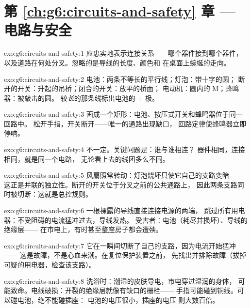 \section*{第 \ref{ch:g6:circuits-and-safety} 章 --- 电路与安全}

\begin{solution}{exo:g6:circuits-and-safety:1}
应忠实地表示连接关系——哪个器件接到哪个器件，
以及道路在何处分叉。忽略的是导线的长度、颜色和
在桌面上蜿蜒的走向。
\end{solution}

\begin{solution}{exo:g6:circuits-and-safety:2}
电池：两条不等长的平行线；灯泡：带十字的圆；
断开的开关：升起的吊桥；闭合的开关：放平的桥面；
电动机：圆内的 M；蜂鸣器：被敲击的圆。
较\emph{长}的那条线标出电池的 $+$ 极。
\end{solution}

\begin{solution}{exo:g6:circuits-and-safety:3}
画成一个矩形：电池、按压式开关和蜂鸣器位于同一回路中。
松开手指，开关断开——唯一的通路出现缺口，
回路定律使蜂鸣器立即停响。
\end{solution}

\begin{solution}{exo:g6:circuits-and-safety:4}
不一定。关键问题是：谁与谁相连？
器件相同，连接相同，就是同一个电路，
无论看上去的线团多么不同。
\end{solution}

\begin{solution}{exo:g6:circuits-and-safety:5}
风扇照常转动：灯泡烧坏只使它自己的支路变暗——
这正是并联的独立性。断开的开关位于分叉之前的公共通路上，
因此两条支路同时被切断：这就是总控规则。
\end{solution}

\begin{solution}{exo:g6:circuits-and-safety:6}
一根裸露的导线直接连接电源的两端，
跳过所有用电器：不受阻碍的电流猛冲过去，导线发热。
受害者：电池（耗尽并损坏）、导线的绝缘层——
在市电上，有时甚至整座房子都会遭殃。
\end{solution}

\begin{solution}{exo:g6:circuits-and-safety:7}
它在一瞬间切断了自己的支路，因为电流开始猛冲——
这是故障，不是心血来潮。在复位保护装置之前，
先找出并排除故障（拔掉可疑的用电器，检查该支路）。
\end{solution}

\begin{solution}{exo:g6:circuits-and-safety:8}
洗浴时：潮湿的皮肤导电，市电穿过湿润的身体，
可能致命。电线破损：开裂的绝缘层就像有缺口的栅栏——
手指可能碰到铜线。可以碰电池，绝不能碰插座：
电池的电压很小，插座的电压
则大数百倍。
\end{solution}

